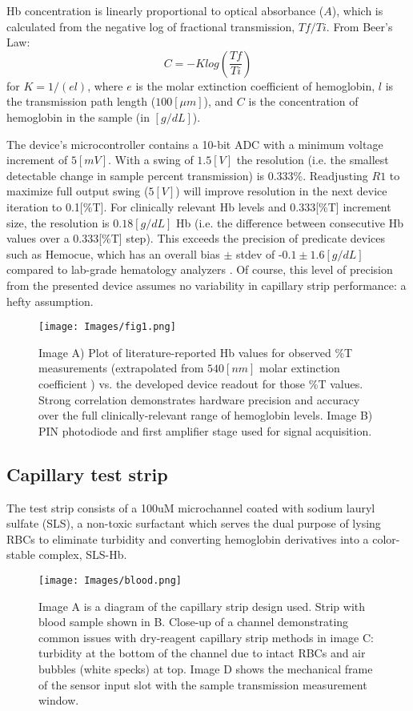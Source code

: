 \documentclass{article}
\begin{document}
Hb concentration is linearly proportional to optical absorbance ($A$), which is calculated from the negative log of fractional transmission, $Tf/Ti$. From Beer’s Law:
\begin{equation}
C = -Klog(\frac{Tf}{Ti})
\end{equation}
for $K = 1/(el)$, where $e$ is the molar extinction coefficient of hemoglobin, $l$ is the transmission path length ($100[\mu m]$), and $C$ is the concentration of hemoglobin in the sample (in $[g/dL]$).

The device's microcontroller contains a 10-bit ADC with a minimum voltage increment of $5[mV]$. With a swing of $1.5[V]$ the resolution (i.e. the smallest detectable change in sample percent transmission) is 0.333\%. Readjusting $R1$ to maximize full output swing ($5[V]$) will improve resolution in the next device iteration to 0.1[\%T]. For clinically relevant Hb levels and 0.333[\%T] increment size, the resolution is $0.18 [g/dL]$ Hb  (i.e. the difference between consecutive Hb values over a 0.333[\%T] step). This exceeds the precision of predicate devices such as Hemocue, which has an overall bias $\pm$ stdev of -$0.1 \pm 1.6[g/dL]$ compared to lab-grade hematology analyzers \cite{shah}. Of course, this level of precision from the presented device assumes no variability in capillary strip performance: a hefty assumption. 

\begin{figure*}[!ht]
\centering
    \texttt{[image: Images/fig1.png]}
    \caption{Image A) Plot of literature-reported Hb values for observed \%T measurements (extrapolated from $540[nm]$ molar extinction coefficient \cite{coeff1}\cite{coeff2}\cite{coeff3}) vs. the developed device readout for those \%T values. Strong correlation demonstrates hardware precision and accuracy over the full clinically-relevant range of hemoglobin levels. Image B) PIN photodiode and first amplifier stage used for signal acquisition.}
    \label{fig:HbCorr}
\end{figure*}
\subsection{Capillary test strip}

The test strip consists of a 100uM microchannel coated with sodium lauryl sulfate (SLS), a non-toxic surfactant which serves the dual purpose of lysing RBCs to eliminate turbidity and converting hemoglobin derivatives into a color-stable complex, SLS-Hb.
\begin{figure*}[!ht]
\centering
    \texttt{[image: Images/blood.png]}
    \caption{Image A is a diagram of the capillary strip design used. Strip with blood sample shown in B. Close-up of a channel demonstrating common issues with dry-reagent capillary strip methods in image C: turbidity at the bottom of the channel due to intact RBCs and air bubbles (white specks) at top. Image D shows the mechanical frame of the sensor input slot with the sample transmission measurement window.}
    \label{fig:blood}
\end{figure*}
\end{document}
